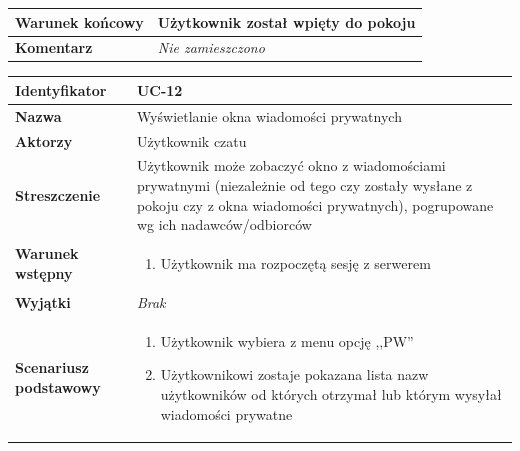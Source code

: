 \documentclass[11pt,oneside,a4paper,titlepage,onecolumn]{article}
\newenvironment{enumreq}
{ \begin{enumerate}[topsep=0pt,itemsep=-1ex,partopsep=1ex,parsep=1ex] }
{ \end{enumerate}                  }
\begin{document}
{\begin{tabular}{ | l | l | }
	\hline
		\parbox[t]{4cm}{\textbf{Warunek końcowy}} & \parbox[t]{11cm}{
			Użytkownik został wpięty do pokoju
		}
		\\
		
	\hline
		\parbox[t]{4cm}{\textbf{Komentarz}} & \parbox[t]{11cm}{
			\textit{Nie zamieszczono}
		}
		\\

	\hline
\end{tabular}

\vspace{2em}

\begin{tabular}{ | l | l | }
	\hline
		\textbf{Identyfikator} & 
		UC-12
		\\
		
	\hline
		\textbf{Nazwa} & 
		Wyświetlanie okna wiadomości prywatnych
		\\
		
	\hline
		\textbf{Aktorzy} & \parbox[t]{11cm}{
			Użytkownik czatu
		}\\
		 
	\hline
		\parbox[t]{4cm}{\textbf{Streszczenie}} & \parbox[t]{11cm}{
			Użytkownik może zobaczyć okno z wiadomościami prywatnymi
			(niezależnie od tego czy zostały wysłane z pokoju czy z okna
			wiadomości prywatnych), pogrupowane wg ich nadawców/odbiorców
			
		}\\
		
	\hline
		\parbox[t]{4cm}{\textbf{Warunek wstępny}} & \parbox[t]{11cm}{
			\begin{enumreq}
				\item Użytkownik ma rozpoczętą sesję z serwerem
			\end{enumreq}
				
		}
		\\
		
	\hline
		\parbox[t]{4cm}{\textbf{Wyjątki}} & \parbox[t]{11cm}{
			\textit{Brak}
			
		}
		\\

	\hline
		\parbox[t]{4cm}{\textbf{Scenariusz podstawowy}} & \parbox[t]{11cm}{
			\begin{enumreq}
				\item Użytkownik wybiera z menu opcję ,,PW''
				\item Użytkownikowi zostaje pokazana lista nazw użytkowników
				od których otrzymał lub którym wysyłał wiadomości prywatne
			\end{enumreq}
		}
		\\
		

\end{tabular}}
\end{document}
